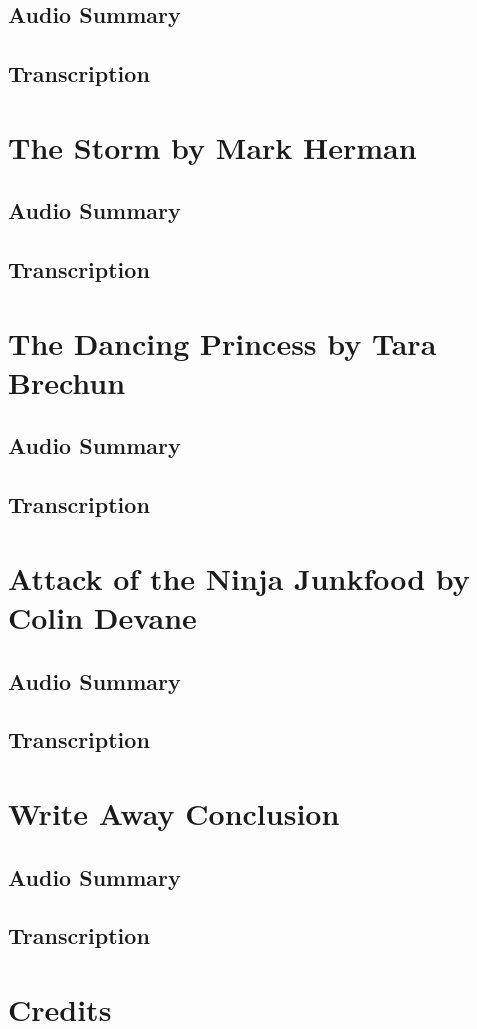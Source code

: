 \subsection{Audio Summary}

\subsection{Transcription}

\section{The Storm by Mark Herman}

\subsection{Audio Summary}

\subsection{Transcription}

\section{The Dancing Princess by Tara Brechun}

\subsection{Audio Summary}

\subsection{Transcription}

\section{Attack of the Ninja Junkfood by Colin Devane}

\subsection{Audio Summary}

\subsection{Transcription}

\section{Write Away Conclusion}

\subsection{Audio Summary}

\subsection{Transcription}

\section{Credits}